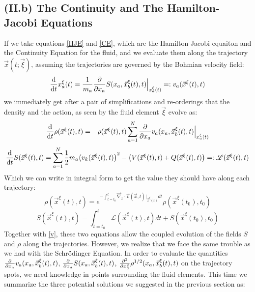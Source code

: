 \documentclass[11pt, a4paper]{article} %
\newcommand{\Lg}{\mathscr{L}}
\begin{document}
\subsection*{(II.b) The Continuity and The Hamilton-Jacobi Equations}

If we take equations \eqref{HJE} and \eqref{CE}, which are the Hamilton-Jacobi equaiton and the Continuity Equation for the fluid, and we evaluate them along the trajectory $\vec{x}(t;\vec{\xi})$, assuming the trajectories are governed by the Bohmian velocity field:
\begin{equation}\label{v}
\dv{}{t}x_a^\xi(t)=\frac{1}{m_a}\pdv{}{x_a}S(x_a, \vec{x}_b^\xi(t),t)\Big\rvert_{x^\xi_a(t)}=:v_a(\vec{x}^\xi(t),t)
\end{equation}
we immediately get after a pair of simplifications and re-orderings that the density and the action, as seen by the fluid element $\vec{\xi}$ evolve as:
\begin{equation}\label{CE.L}
\dv{}{t}\rho(\vec{x}^\xi(t),t)=-\rho(\vec{x}^\xi(t),t)\sum_{a=1}^N\pdv{}{x_a} v_a(x_a, \vec{x}_b^\xi(t),t)\Big\rvert_{x_a^\xi(t)}
\end{equation}
\begin{equation}\label{HJE.L}
\dv{}{t}S(\vec{x}^\xi(t),t)=  \sum_{a=1}^N \frac{1}{2} m_a \qty(v_k(\vec{x}^\xi(t),t) )^2 - \qty(V(\vec{x}^\xi(t),t)+ Q(\vec{x}^\xi(t),t))=: \Lg(\vec{x}^\xi(t),t)
\end{equation}
Which we can write in integral form to get the value they should have along each trajectory:
\begin{equation}\label{JacPre}
\rho(\vec{x}^\xi(t),t)=e^{-\int_{t=t_0}^t \vec{\nabla}_x\cdot \vec{v}(\vec{x},t)\rvert_{\vec{x}^\xi(t)} dt}\rho(\vec{x}^\xi(t_0),t_0)
\end{equation}
\begin{equation}\label{ActPre}
S(\vec{x}^\xi(t),t)=\int_{t=t_0}^t \Lg(\vec{x}^\xi(t),t) dt+S(\vec{x}^\xi(t_0),t_0)
\end{equation}
Together with \eqref{v}, these two equations allow the coupled evolution of the fields $S$ and $\rho$ along the trajectories. However, we realize that we face the same trouble as we had with the Schrödinger Equation. In order to evaluate the quantities $\pdv{}{x_a} v_a(x_a, \vec{x}_b^\xi(t),t)$, $\pdv{}{x_a}S(x_a, \vec{x}_b^\xi(t),t)$, $\pdv[2]{}{x_a}\rho^{1/2}(x_a, \vec{x}_b^\xi(t),t)$ on the trajectory spots, we need knowledge in points surrounding the fluid elements. This time we summarize the three potential solutions we suggested in the previous section as:
\end{document}
